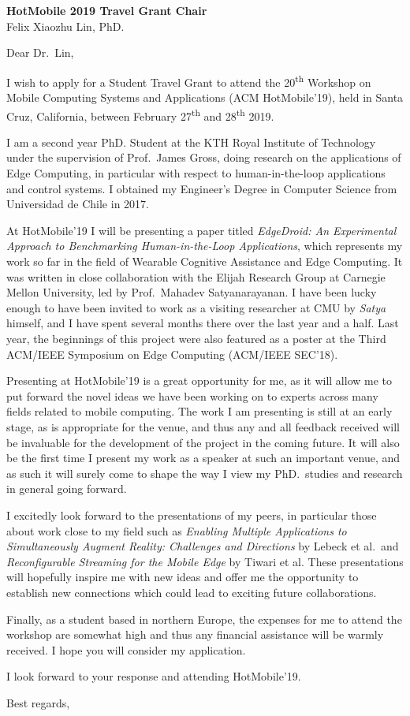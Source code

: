 \documentclass[english, 11pt]{kthletter}
\date{Stockholm, \today}
\begin{document}
\begin{letter}%
  {\textbf{HotMobile 2019 Travel Grant Chair}\\Felix Xiaozhu Lin, PhD.}
\opening{Dear Dr.~Lin,}

I wish to apply for a Student Travel Grant to attend the 20\textsuperscript{th} Workshop on Mobile Computing Systems and Applications (ACM HotMobile'19), held in Santa Cruz, California, between February 27\textsuperscript{th} and 28\textsuperscript{th} 2019.

I am a second year PhD. Student at the KTH Royal Institute of Technology under the supervision of Prof.\ James Gross, doing research on the applications of Edge Computing, in particular with respect to human-in-the-loop applications and control systems.
I obtained my Engineer's Degree in Computer Science from Universidad de Chile in 2017.

At HotMobile'19 I will be presenting a paper titled \emph{EdgeDroid: An Experimental Approach to Benchmarking Human-in-the-Loop Applications}, which represents my work so far in the field of Wearable Cognitive Assistance and Edge Computing.
It was written in close collaboration with the Elijah Research Group at Carnegie Mellon University, led by Prof.\ Mahadev Satyanarayanan.
I have been lucky enough to have been invited to work as a visiting researcher at CMU by \emph{Satya} himself, and I have spent several months there over the last year and a half.
Last year, the beginnings of this project were also featured as a poster at the Third ACM/IEEE Symposium on Edge Computing (ACM/IEEE SEC'18).

Presenting at HotMobile'19 is a great opportunity for me, as it will allow me to put forward the novel ideas we have been working on to experts across many fields related to mobile computing.
The work I am presenting is still at an early stage, as is appropriate for the venue, and thus any and all feedback received will be invaluable for the development of the project in the coming future. It will also be the first time I present my work as a speaker at such an important venue, and as such it will surely come to shape the way I view my PhD.\ studies and research in general going forward.

I excitedly look forward to the presentations of my peers, in particular those about work close to my field such as \emph{Enabling Multiple Applications to Simultaneously Augment Reality: Challenges and Directions} by Lebeck et al.\ and \emph{Reconfigurable Streaming for the Mobile Edge} by Tiwari et al.
These presentations will hopefully inspire me with new ideas and offer me the opportunity to establish new connections which could lead to exciting future collaborations.

Finally, as a student based in northern Europe, the expenses for me to attend the workshop are somewhat high and thus any financial assistance will be warmly received.
I hope you will consider my application.

I look forward to your response and attending HotMobile'19.

\closing{Best regards,}

\end{letter}
\end{document}
